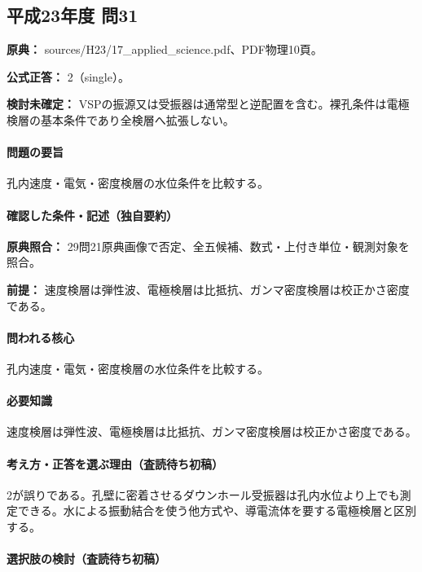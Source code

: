 \subsection{平成23年度 問31}
\label{q:h23-reg-applied-31}

\noindent\textbf{原典：} sources/H23/17\_applied\_science.pdf、PDF物理10頁。

\textbf{公式正答：} 2（single）。

\par\textbf{検討未確定：} VSPの振源又は受振器は通常型と逆配置を含む。裸孔条件は電極検層の基本条件であり全検層へ拡張しない。

\paragraph{問題の要旨} 孔内速度・電気・密度検層の水位条件を比較する。

\paragraph{確認した条件・記述（独自要約）}\mbox{}\par

\noindent\textbf{原典照合：} 29問21原典画像で否定、全五候補、数式・上付き単位・観測対象を照合。\par

\noindent\textbf{前提：} 速度検層は弾性波、電極検層は比抵抗、ガンマ密度検層は校正かさ密度である。\par

\paragraph{問われる核心} 孔内速度・電気・密度検層の水位条件を比較する。

\paragraph{必要知識} 速度検層は弾性波、電極検層は比抵抗、ガンマ密度検層は校正かさ密度である。

\paragraph{考え方・正答を選ぶ理由（査読待ち初稿）} 2が誤りである。孔壁に密着させるダウンホール受振器は孔内水位より上でも測定できる。水による振動結合を使う他方式や、導電流体を要する電極検層と区別する。

\paragraph{選択肢の検討（査読待ち初稿）}\mbox{}\par

